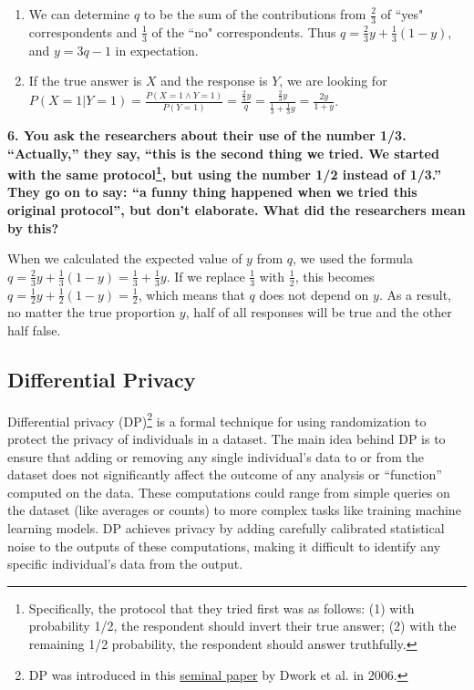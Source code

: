 \documentclass{article}
\begin{document}
\bigskip
\begin{mdframed}
\begin{enumerate}[label=\Alph*.]
\item We can determine $q$ to be the sum of the contributions from $\frac{2}{3}$ of ``yes" correspondents and $\frac{1}{3}$ of the ``no" correspondents. Thus $q = \frac{2}{3}y + \frac{1}{3}(1-y)$, and $y = 3q - 1$ in expectation.
\item If the true answer is $X$ and the response is $Y$, we are looking for $P(X=1 | Y = 1) = \frac{P(X=1\land Y=1)}{P(Y=1)} = \frac{\frac{2}{3}y}{q} = \frac{\frac{2}{3}y}{\frac{1}{3} + \frac{1}{3}y} = \frac{2y}{1 + y}$.
\end{enumerate}
\end{mdframed}
\bigskip

\textbf{6. You ask the researchers about their use of the number 1/3. ``Actually,'' they say, ``this is the second thing we tried. We started with the same protocol\footnote{Specifically, the protocol that they tried first was as follows: (1) with probability 1/2, the respondent should invert their true answer; (2) with the remaining 1/2 probability, the respondent should answer truthfully.}, but using the number 1/2 instead of 1/3.'' They go on to say: ``a funny thing happened when we tried this original protocol'', but don't elaborate. What did the researchers mean by this?}

\bigskip
\begin{mdframed}
When we calculated the expected value of $y$ from $q$, we used the formula $q = \frac{2}{3}y + \frac{1}{3}(1-y) = \frac{1}{3} + \frac{1}{3}y$. If we replace $\frac{1}{3}$ with $\frac{1}{2}$, this becomes $q = \frac{1}{2}y + \frac{1}{2}(1-y) = \frac{1}{2}$, which means that $q$ does not depend on $y$. As a result, no matter the true proportion $y$, half of all responses will be true and the other half false.
\end{mdframed}
\bigskip


\subsection*{Differential Privacy}

Differential privacy (DP)\footnote{DP was introduced in this \href{https://uvammm.github.io/docs/dwork.pdf}{seminal paper} by Dwork et al. in 2006.} is a formal technique for using randomization to protect the privacy of individuals in a dataset. The main idea behind DP is to ensure that adding or removing any single individual's data to or from the dataset does not significantly affect the outcome of any analysis or ``function'' computed on the data. These computations could range from simple queries on the dataset (like averages or counts) to more complex tasks like training machine learning models. DP achieves privacy by adding carefully calibrated statistical noise to the outputs of these computations, making it difficult to identify any specific individual's data from the output. 
\end{document}

